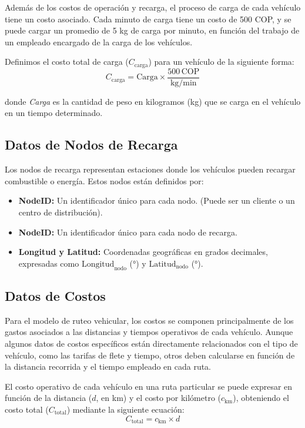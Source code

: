 \documentclass[12pt]{article}
\begin{document}
Además de los costos de operación y recarga, el proceso de carga de cada vehículo tiene un costo asociado. Cada minuto de carga tiene un costo de 500 COP, y se puede cargar un promedio de 5 kg de carga por minuto, en función del trabajo de un empleado encargado de la carga de los vehículos.

Definimos el costo total de carga ($C_{\text{carga}}$) para un vehículo de la siguiente forma:
\begin{equation}
C_{\text{carga}} = \text{Carga} \times \frac{500 \, \text{COP}}{\text{kg/min}}
\end{equation}

donde \textit{Carga} es la cantidad de peso en kilogramos (kg) que se carga en el vehículo en un tiempo determinado.

\subsection{Datos de Nodos de Recarga}

Los nodos de recarga representan estaciones donde los vehículos pueden recargar combustible o energía. Estos nodos están definidos por:
\begin{itemize}
    \item \textbf{NodeID:} Un identificador único para cada nodo. (Puede ser un cliente o un centro de distribución).
    \item \textbf{NodeID:} Un identificador único para cada nodo de recarga.
    \item \textbf{Longitud y Latitud:} Coordenadas geográficas en grados decimales, expresadas como $\text{Longitud}_{\text{nodo}}$ (°) y $\text{Latitud}_{\text{nodo}}$ (°).
\end{itemize}

\subsection{Datos de Costos}

Para el modelo de ruteo vehicular, los costos se componen principalmente de los gastos asociados a las distancias y tiempos operativos de cada vehículo. Aunque algunos datos de costos específicos están directamente relacionados con el tipo de vehículo, como las tarifas de flete y tiempo, otros deben calcularse en función de la distancia recorrida y el tiempo empleado en cada ruta.

El costo operativo de cada vehículo en una ruta particular se puede expresar en función de la distancia ($d$, en km) y el costo por kilómetro ($c_{\text{km}}$), obteniendo el costo total ($C_{\text{total}}$) mediante la siguiente ecuación:
\begin{equation}
C_{\text{total}} = c_{\text{km}} \times d
\end{equation}
\end{document}
